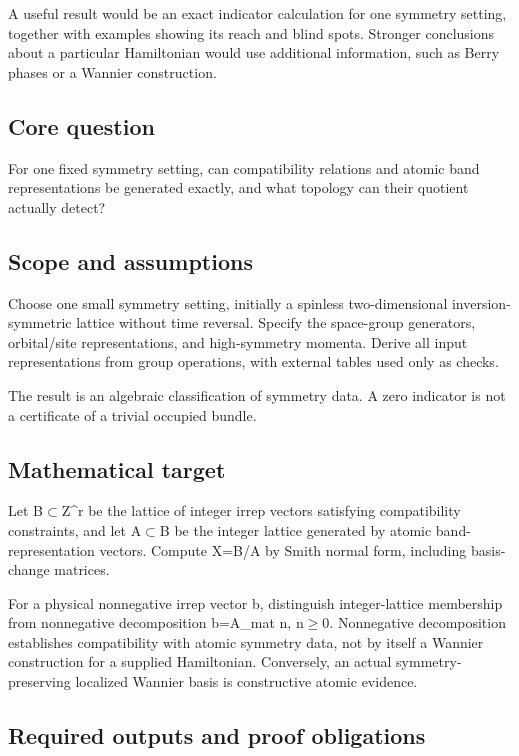 \documentclass[
  11pt,
]{article}
\begin{document}
A useful result would be an exact indicator calculation for one symmetry
setting, together with examples showing its reach and blind spots.
Stronger conclusions about a particular Hamiltonian would use additional
information, such as Berry phases or a Wannier construction.

\subsection{Core question}

For one fixed symmetry setting, can compatibility relations and atomic
band representations be generated exactly, and what topology can their
quotient actually detect?

\subsection{Scope and assumptions}

Choose one small symmetry setting, initially a spinless two-dimensional
inversion-symmetric lattice without time reversal. Specify the
space-group generators, orbital/site representations, and high-symmetry
momenta. Derive all input representations from group operations, with
external tables used only as checks.

The result is an algebraic classification of symmetry data. A zero
indicator is not a certificate of a trivial occupied bundle.

\subsection{Mathematical target}

Let B\ensuremath{\subset}Z\textasciicircum{}r be the lattice of integer
irrep vectors satisfying compatibility constraints, and let
A\ensuremath{\subset}B be the integer lattice generated by atomic
band-representation vectors. Compute X=B/A by Smith normal form,
including basis-change matrices.

For a physical nonnegative irrep vector b, distinguish integer-lattice
membership from nonnegative decomposition b=A\_mat n,
n\ensuremath{\ge}0. Nonnegative decomposition establishes compatibility
with atomic symmetry data, not by itself a Wannier construction for a
supplied Hamiltonian. Conversely, an actual symmetry-preserving
localized Wannier basis is constructive atomic evidence.

\subsection{Required outputs and proof obligations}
\end{document}
